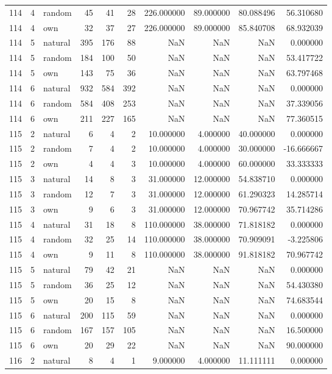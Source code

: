 \begin{table}[htbp]
\begin{tabular}{rrlrrrrrrr}
114 & 4 & random & 45 & 41 & 28 & 226.000000 & 89.000000 & 80.088496 & 56.310680 \\
114 & 4 & own & 32 & 37 & 27 & 226.000000 & 89.000000 & 85.840708 & 68.932039 \\
114 & 5 & natural & 395 & 176 & 88 & NaN & NaN & NaN & 0.000000 \\
114 & 5 & random & 184 & 100 & 50 & NaN & NaN & NaN & 53.417722 \\
114 & 5 & own & 143 & 75 & 36 & NaN & NaN & NaN & 63.797468 \\
114 & 6 & natural & 932 & 584 & 392 & NaN & NaN & NaN & 0.000000 \\
114 & 6 & random & 584 & 408 & 253 & NaN & NaN & NaN & 37.339056 \\
114 & 6 & own & 211 & 227 & 165 & NaN & NaN & NaN & 77.360515 \\
115 & 2 & natural & 6 & 4 & 2 & 10.000000 & 4.000000 & 40.000000 & 0.000000 \\
115 & 2 & random & 7 & 4 & 2 & 10.000000 & 4.000000 & 30.000000 & -16.666667 \\
115 & 2 & own & 4 & 4 & 3 & 10.000000 & 4.000000 & 60.000000 & 33.333333 \\
115 & 3 & natural & 14 & 8 & 3 & 31.000000 & 12.000000 & 54.838710 & 0.000000 \\
115 & 3 & random & 12 & 7 & 3 & 31.000000 & 12.000000 & 61.290323 & 14.285714 \\
115 & 3 & own & 9 & 6 & 3 & 31.000000 & 12.000000 & 70.967742 & 35.714286 \\
115 & 4 & natural & 31 & 18 & 8 & 110.000000 & 38.000000 & 71.818182 & 0.000000 \\
115 & 4 & random & 32 & 25 & 14 & 110.000000 & 38.000000 & 70.909091 & -3.225806 \\
115 & 4 & own & 9 & 11 & 8 & 110.000000 & 38.000000 & 91.818182 & 70.967742 \\
115 & 5 & natural & 79 & 42 & 21 & NaN & NaN & NaN & 0.000000 \\
115 & 5 & random & 36 & 25 & 12 & NaN & NaN & NaN & 54.430380 \\
115 & 5 & own & 20 & 15 & 8 & NaN & NaN & NaN & 74.683544 \\
115 & 6 & natural & 200 & 115 & 59 & NaN & NaN & NaN & 0.000000 \\
115 & 6 & random & 167 & 157 & 105 & NaN & NaN & NaN & 16.500000 \\
115 & 6 & own & 20 & 29 & 22 & NaN & NaN & NaN & 90.000000 \\
116 & 2 & natural & 8 & 4 & 1 & 9.000000 & 4.000000 & 11.111111 & 0.000000 \\

\end{tabular}
\end{table}
